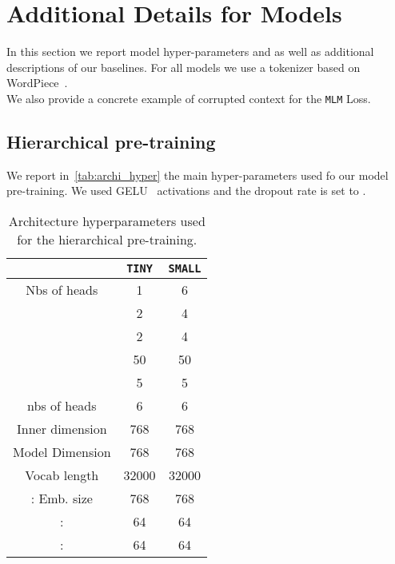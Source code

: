 \documentclass[11pt,a4paper]{article}
\begin{document}
\section{Additional Details for Models}
\label{sec:sup_model}
In this section we report model hyper-parameters and as well as additional descriptions of our baselines. For all models we use a tokenizer based on WordPiece~\cite{wordpiece}.\\
We also provide a concrete example of corrupted context for the \texttt{MLM} Loss.

\subsection{Hierarchical pre-training}
We report in~\autoref{tab:archi_hyper} the main hyper-parameters used fo our model pre-training. We used GELU~\cite{gelu} activations and the dropout rate \cite{dropout} is set to .
\begin{table}[]
    \centering
    \begin{tabular}{c|cc}\hline
     & \texttt{TINY}& \texttt{SMALL}  \\\hline
     Nbs of heads   & 1& 6  \\
        & 2&4 \\
       &2 & 4\\
       & 50 & 50\\
       & 5 & 5\\
       nbs of heads  &6 &6 \\
      Inner dimension  &768 &768 \\
  Model Dimension   &768 &768 \\
Vocab length  &32000 &32000 \\
  : Emb. size& 768 &768 \\
  :&64 & 64\\
  : &64 & 64
    \end{tabular}
    \caption{Architecture hyperparameters used for the hierarchical pre-training.}
    \label{tab:archi_hyper}
\end{table}
\end{document}
